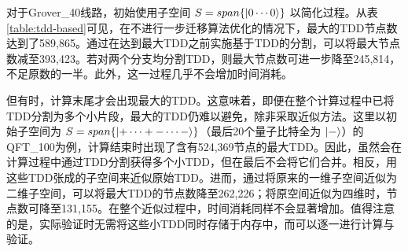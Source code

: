 对于Grover\_40线路，初始使用子空间 $S=span\{\ket{0\cdots0}\}$ 以简化过程。从表\ref{table:tdd-based}可见，在不进行一步迁移算法优化的情况下，最大的TDD节点数达到了589,865。通过在达到最大TDD之前实施基于TDD的分割，可以将最大节点数减至393,423。若对两个分支均分割TDD，则最大节点数可进一步降至245,814，不足原数的一半。此外，这一过程几乎不会增加时间消耗。
    
但有时，计算末尾才会出现最大的TDD。这意味着，即便在整个计算过程中已将TDD分割为多个小片段，最大的TDD仍难以避免，除非采取近似方法。这里以初始子空间为 $S=span\{\ket{+\cdots+ -\cdots -}\}$（最后20个量子比特全为 $\ket{-}$）的QFT\_100为例，计算结束时出现了含有524,369节点的最大TDD。因此，虽然会在计算过程中通过TDD分割获得多个小TDD，但在最后不会将它们合并。相反，用这些TDD张成的子空间来近似原始TDD。进而，通过将原来的一维子空间近似为二维子空间，可以将最大TDD的节点数降至262,226；将原空间近似为四维时，节点数可降至131,155。在整个近似过程中，时间消耗同样不会显著增加。值得注意的是，实际验证时无需将这些小TDD同时存储于内存中，而可以逐一进行计算与验证。

\begin{table}[]
    
    \caption{TDD拆分与近似的优化方案}

    \label{table:tdd-based}
    \centering
\end{table}

